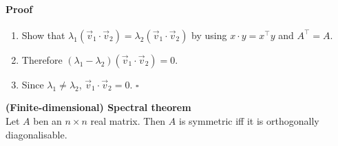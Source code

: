 \documentclass{article}
\begin{document}
\paragraph*{Proof}
\begin{enumerate}
	\item Show that $\lambda_1(\vec v_1 \cdot \vec v_2)=\lambda_2(\vec v_1\cdot\vec v_2)$ by using $x\cdot y =x^\intercal y$ and $A^\intercal =A$.
	\item Therefore $(\lambda_1-\lambda_2)(\vec v_1 \cdot \vec v_2)=0$.
	\item Since $\lambda_1\not=\lambda_2$, $\vec v_1 \cdot \vec v_2=0$. $\square$
\end{enumerate}
\begin{theorem}
	\textbf{(Finite-dimensional) Spectral theorem}\\
	Let $A$ ben an $n\times n$ real matrix. Then $A$ is symmetric iff it is orthogonally diagonalisable.
\end{theorem}
\end{document}

